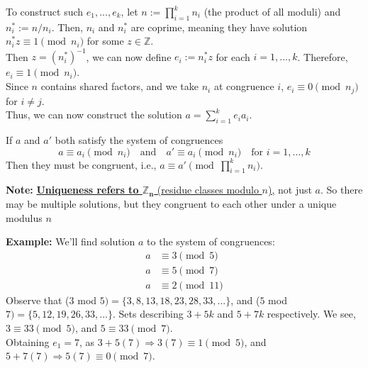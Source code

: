 \newpage

\begin{Proof}

\noindent
To construct such $e_1,...,e_k$, let $n := \prod_{i=1}^k n_i$ (the product of all moduli) and $n_i^* := n/n_i$. Then, $n_i$ and $n_i^*$ are coprime, meaning they have solution $n_i^*z\equiv 1\pmod{n_i}$ for some $z\in\mathbb{Z}$.\\

\noindent
Then $z=(n_i^*)^{-1}$, we can now define $e_i := n_i^*z$ for each $i=1,...,k$. Therefore, $e_i\equiv 1\pmod{n_i}$.\\
Since $n$ contains shared factors, and we take $n_i$ at congruence $i$, $e_i\equiv 0\pmod{n_j}$ for $i\neq j$.\\

\noindent
Thus, we can now construct the solution $a = \sum_{i=1}^k e_ia_i$.

\end{Proof}
\begin{Proof}

    If \( a \) and \( a' \) both satisfy the system of congruences
    \[
    a \equiv a_i \pmod{n_i} \quad \text{and} \quad a' \equiv a_i \pmod{n_i} \quad \text{for } i = 1, \dots, k
    \]
    Then they must be congruent, i.e., \( a \equiv a' \pmod{\prod_{i=1}^k n_i} \).\\
\end{Proof}
\begin{Note}
    \textbf{Note:} \underline{\textbf{Uniqueness refers to $\mathbf{\mathbb{Z}_n}$} (residue classes modulo $n$),} not just $a$. So there may be multiple solutions, but they congruent to each other under a unique modulus $n$
\end{Note}
\textbf{Example:} We'll find solution $a$ to the system of congruences:
\begin{align*}
    a &\equiv 3 \pmod{5} \\
    a &\equiv 5 \pmod{7} \\
    a &\equiv 2 \pmod{11}
\end{align*}
Observe that ($3$ mod $5)=\{3,8,13,18,23,28,33,...\}$, and ($5$ mod $7)=\{5,12,19,26,33,...\}$.
Sets describing $3+5k$ and $5+7k$ respectively. We see,  $3\equiv 33\pmod{5}$, and $5\equiv 33\pmod{7}$.\\

\noindent
Obtaining $e_1=7$, as $3+5(7)\Longrightarrow3(7)\equiv 1\pmod{5}$, and $5+7(7)\Longrightarrow5(7)\equiv0\pmod{7}$. 


